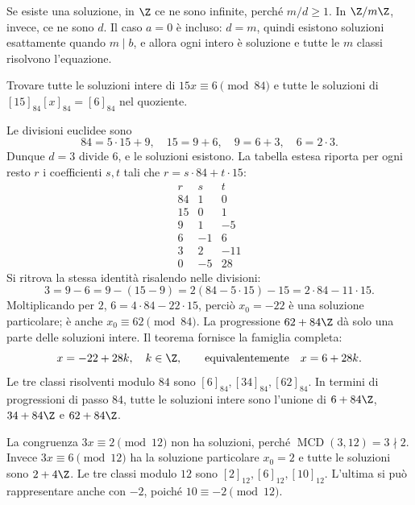 \begin{osservazione}
Se esiste una soluzione, in $\Z$ ce ne sono infinite, perché $m/d\ge1$. In $\Z/m\Z$, invece, ce ne sono $d$. Il caso $a=0$ è incluso: $d=m$, quindi esistono soluzioni esattamente quando $m\mid b$, e allora ogni intero è soluzione e tutte le $m$ classi risolvono l'equazione.
\end{osservazione}

\begin{esercizio}
Trovare tutte le soluzioni intere di $15x\equiv6\pmod{84}$ e tutte le soluzioni di $[15]_{84}[x]_{84}=[6]_{84}$ nel quoziente.
\end{esercizio}
\begin{svolgimento}
Le divisioni euclidee sono
\[
84=5\cdot15+9,\quad 15=9+6,\quad 9=6+3,\quad 6=2\cdot3.
\]
Dunque $d=3$ divide $6$, e le soluzioni esistono. La tabella estesa riporta per ogni resto $r$ i coefficienti $s,t$ tali che $r=s\cdot84+t\cdot15$:
\[
\begin{array}{r|r|r}
r&s&t\\\hline
84&1&0\\15&0&1\\9&1&-5\\6&-1&6\\3&2&-11\\0&-5&28
\end{array}
\]
Si ritrova la stessa identità risalendo nelle divisioni:
\[
3=9-6=9-(15-9)=2(84-5\cdot15)-15=2\cdot84-11\cdot15.
\]
Moltiplicando per $2$, $6=4\cdot84-22\cdot15$, perciò $x_0=-22$ è una soluzione particolare; è anche $x_0\equiv62\pmod{84}$. La progressione $62+84\Z$ dà solo una parte delle soluzioni intere. Il teorema fornisce la famiglia completa:
\[
x=-22+28k,\quad k\in\Z,\qquad\text{equivalentemente}\quad x=6+28k.
\]
Le tre classi risolventi modulo $84$ sono $[6]_{84},[34]_{84},[62]_{84}$. In termini di progressioni di passo $84$, tutte le soluzioni intere sono l'unione di $6+84\Z$, $34+84\Z$ e $62+84\Z$.
\end{svolgimento}

\begin{esempio}
La congruenza $3x\equiv2\pmod{12}$ non ha soluzioni, perché $\operatorname{MCD}(3,12)=3\nmid2$. Invece $3x\equiv6\pmod{12}$ ha la soluzione particolare $x_0=2$ e tutte le soluzioni sono $2+4\Z$. Le tre classi modulo $12$ sono $[2]_{12},[6]_{12},[10]_{12}$. L'ultima si può rappresentare anche con $-2$, poiché $10\equiv-2\pmod{12}$.
\end{esempio}

